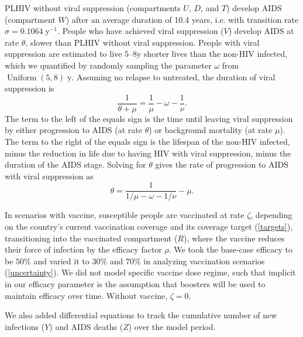 \documentclass{article}
\DeclareMathOperator{\Uniform}{Uniform}
\begin{document}
PLHIV without viral suppression (compartments $U$, $D$, and $T$)
develop AIDS (compartment $W$) after an average duration of 10.4
years\cite{Morgan2002-cq}, i.e. with transition rate
$\sigma = 0.1064\;\text{y$^{-1}$}$.  People who have achieved viral
suppression ($V$) develop AIDS at rate $\theta$, slower than PLHIV
without viral suppression.  People with viral suppression are
estimated to live $5$--$8$\;y shorter lives than the non-HIV
infected\cite{Samji2013-kf, Unaids2014-ue}, which we quantified by
randomly sampling the parameter $\omega$ from
$\Uniform(5, 8)\;\text{y}$.  Assuming no relapse to untreated, the
duration of viral suppression is
\begin{equation}
  \frac{1}{\theta + \mu} = \frac{1}{\mu} - \omega - \frac{1}{\nu}.
\end{equation}
The term to the left of the equals sign is the time until leaving
viral suppression by either progression to AIDS (at rate $\theta$) or
background mortality (at rate $\mu$).  The term to the right of the
equals sign is the lifespan of the non-HIV infected, minus the
reduction in life due to having HIV with viral suppression, minus the
duration of the AIDS stage.  Solving for $\theta$ gives the rate of
progression to AIDS with viral suppression as
\begin{equation}
  \label{theta}
  \theta = \frac{1}{1/\mu - \omega - 1/\nu} - \mu.
\end{equation}

In scenarios with vaccine, susceptible people are vaccinated at rate
$\zeta$, depending on the country's current vaccination coverage and
its coverage target (\autoref{targets}), transitioning into the
vaccinated compartment ($R$), where the vaccine reduces their force of
infection by the efficacy factor $\rho$.  We took the base-case
efficacy to be $50\%$ and varied it to $30\%$ and $70\%$ in analyzing
vaccination scenarios (\autoref{uncertainty}).  We did not model
specific vaccine dose regime, such that implicit in our efficacy
parameter is the assumption that boosters will be used to maintain
efficacy over time.  Without vaccine, $\zeta = 0$.

We also added differential equations to track the cumulative number of
new infections ($Y$) and AIDS deaths ($Z$) over the model period.
\end{document}
